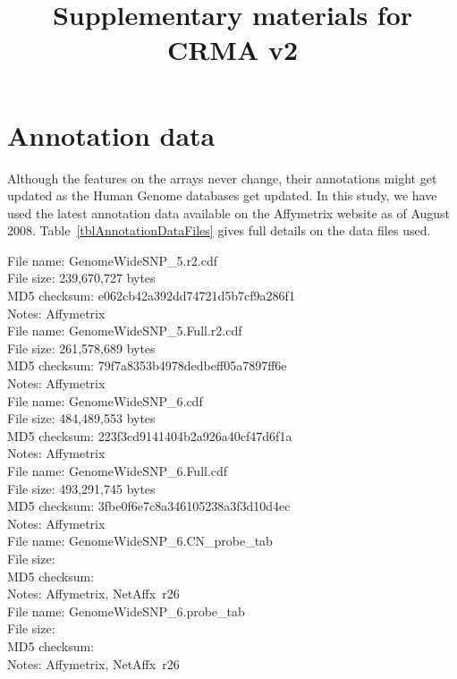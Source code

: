 \documentclass[11pt,a4paper]{article}
\begin{document}
\title{Supplementary materials for CRMA v2}
\maketitle


\section*{Annotation data}
Although the features on the arrays never change, their annotations might get updated as the Human Genome databases get updated.  In this study, we have used the latest annotation data available on the Affymetrix website as of August 2008.  Table~\ref{tblAnnotationDataFiles} gives full details on the data files used.

File name: GenomeWideSNP\_5.r2.cdf \\
File size: 239,670,727 bytes \\
MD5 checksum: e062cb42a392dd74721d5b7cf9a286f1 \\
Notes: Affymetrix \\

File name: GenomeWideSNP\_5.Full.r2.cdf \\
File size: 261,578,689 bytes \\
MD5 checksum: 79f7a8353b4978dedbeff05a7897ff6e \\
Notes: Affymetrix \\

File name: GenomeWideSNP\_6.cdf \\
File size: 484,489,553 bytes \\
MD5 checksum: 223f3cd9141404b2a926a40cf47d6f1a \\
Notes: Affymetrix \\

File name: GenomeWideSNP\_6.Full.cdf \\
File size: 493,291,745 bytes \\
MD5 checksum: 3fbe0f6e7c8a346105238a3f3d10d4ec \\
Notes: Affymetrix \\

File name: GenomeWideSNP\_6.CN\_probe\_tab \\
File size:  \\
MD5 checksum: \\
Notes: Affymetrix, NetAffx~r26 \\

File name: GenomeWideSNP\_6.probe\_tab \\
File size: \\
MD5 checksum: \\ 
Notes: Affymetrix, NetAffx~r26 \\
\end{document}
